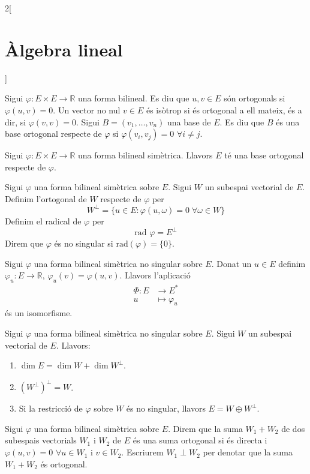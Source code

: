 \documentclass[class=article,10pt,crop=false]{standalone}
\begin{document}
\begin{multicols}{2}[\section{Àlgebra lineal}]
\begin{prop}
\end{prop}
\begin{definition}
Sigui $\varphi:E\times E\rightarrow \mathbb{R}$ una forma bilineal. Es diu que $u,v\in E$ són ortogonals si $\varphi(u,v)=0$. Un vector no nul $v\in E$ és isòtrop si és ortogonal a ell mateix, és a dir, si $\varphi(v,v)=0$. Sigui $B=(v_1,\ldots,v_n)$ una base de $E$. Es diu que $B$ és una base ortogonal respecte de $\varphi$ si $\varphi(v_i,v_j)=0$ $\forall i\ne j$.
\end{definition}
\begin{theorem}
Sigui $\varphi:E\times E\rightarrow \mathbb{R}$ una forma bilineal simètrica. Llavors $E$ té una base ortogonal respecte de $\varphi$.
\end{theorem}
\begin{definition}
Sigui $\varphi$ una forma bilineal simètrica sobre $E$. Sigui $W$ un subespai vectorial de $E$. Definim l'ortogonal de $W$ respecte de $\varphi$ per $$W^\perp=\{u\in E:\varphi(u,\omega)=0\;\forall\omega\in W\}$$ Definim el radical de $\varphi$ per $$\text{rad }\varphi=E^\perp$$ Direm que $\varphi$ és no singular si $\text{rad}(\varphi)=\{0\}$.
\end{definition}
\begin{definition}
Sigui $\varphi$ una forma bilineal simètrica no singular sobre $E$. Donat un $u\in E$ definim $\varphi_u:E\rightarrow\mathbb{R}$, $\varphi_u(v)=\varphi(u,v)$. Llavors l'aplicació 
\begin{align*}
    \Phi: E&\rightarrow E^*\\
    u&\mapsto\varphi_u
\end{align*} és un isomorfisme. 
\end{definition}
\begin{definition}
Sigui $\varphi$ una forma bilineal simètrica no singular sobre $E$. Sigui $W$ un subespai vectorial de $E$. Llavors:
\begin{enumerate}
    \item $\dim E=\dim W+\dim W^\perp$.
    \item $(W^\perp)^\perp=W$.
    \item Si la restricció de $\varphi$ sobre $W$ és no singular, llavors $E=W\oplus W^\perp$.
\end{enumerate}
\end{definition}
\begin{definition}
Sigui $\varphi$ una forma bilineal simètrica sobre $E$. Direm que la suma $W_1+W_2$ de dos subespais vectorials $W_1$ i $W_2$ de $E$ és una suma ortogonal si és directa i $\varphi(u,v)=0$ $\forall u\in W_1$ i $v\in W_2$. Escriurem $W_1\perp W_2$ per denotar que la suma $W_1+W_2$ és ortogonal.

\end{definition}
\end{multicols}
\end{document}
